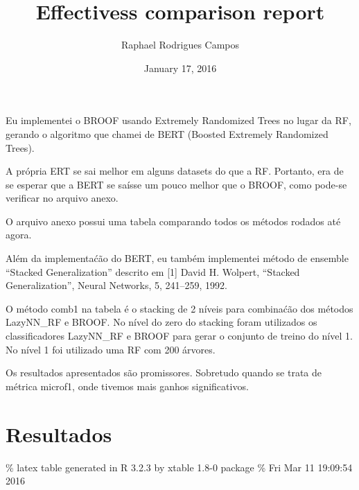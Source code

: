 \documentclass[]{article}
\title{Effectivess comparison report}
\author{Raphael Rodrigues Campos}
\date{January 17, 2016}
\begin{document}
\maketitle


Eu implementei o BROOF usando Extremely Randomized Trees no lugar da RF,
gerando o algoritmo que chamei de BERT (Boosted Extremely Randomized
Trees).

A própria ERT se sai melhor em alguns datasets do que a RF. Portanto,
era de se esperar que a BERT se saísse um pouco melhor que o BROOF, como
pode-se verificar no arquivo anexo.

O arquivo anexo possui uma tabela comparando todos os métodos rodados
até agora.

Além da implementaćão do BERT, eu também implementei método de ensemble
``Stacked Generalization'' descrito em {[}1{]} David H. Wolpert,
``Stacked Generalization'', Neural Networks, 5, 241--259, 1992.

O método comb1 na tabela é o stacking de 2 níveis para combinaćão dos
métodos LazyNN\_RF e BROOF. No nível do zero do stacking foram
utilizados os classificadores LazyNN\_RF e BROOF para gerar o conjunto
de treino do nível 1. No nível 1 foi utilizado uma RF com 200 árvores.

Os resultados apresentados são promissores. Sobretudo quando se trata de
métrica microf1, onde tivemos mais ganhos significativos.

\section{Resultados}\label{resultados}

\% latex table generated in R 3.2.3 by xtable 1.8-0 package \% Fri Mar
11 19:09:54 2016
\end{document}
